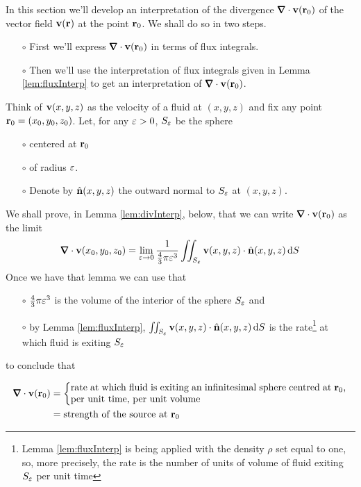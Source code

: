 In this section we'll develop an interpretation of the divergence
$\vnabla\cdot\vv(\vr_0)$ of the vector field $\mathbf{v}(\mathbf{r})$ at the point 
$\mathbf{r}_0$. We shall do so in two steps. 
\begin{itemize}\itemsep1pt \parskip0pt  %
\item[$\circ$]
First we'll express $\vnabla\cdot\vv(\vr_0)$ in terms of flux integrals.
\item[$\circ$] 
Then we'll use the interpretation of flux integrals given in 
Lemma \ref{lem:fluxInterp} to get an interpretation of 
$\vnabla\cdot\vv(\vr_0)$.

\end{itemize}
Think of $\mathbf{v}(x,y,z)$ as the velocity of a fluid at $(x,y,z)$ 
and fix any point $\mathbf{r}_0=(x_0,y_0,z_0)$. Let, for any $\varepsilon>0$,
$S_\varepsilon$ be the sphere
\begin{itemize}\itemsep1pt \parskip0pt  %
\item[$\circ$] centered at $\mathbf{r}_0$
\item[$\circ$] of radius $\varepsilon$.
\item[$\circ$] Denote by $\hat{\mathbf{n}}(x,y,z)$ the outward normal to $S_\varepsilon$
 at $(x,y,z)$.
\end{itemize}
We shall prove, in Lemma \ref{lem:divInterp}, below, that we can write
$\vnabla\cdot\vv(\vr_0)$ as the limit
\begin{align*}
\vnabla\cdot\vv(x_0,y_0,z_0)
=\lim_{\veps\rightarrow 0}
     \frac{1}{\frac{4}{3}\pi\veps^3}
           \dblInt_{S_\veps}\vv(x,y,z)\cdot\hn(x,y,z)\,\dee{S}
\end{align*}
Once we have that lemma we can use that
\begin{itemize}\itemsep1pt \parskip0pt  %
\item[$\circ$]
$\frac{4}{3}\pi\varepsilon^3$ is the volume of the interior of the sphere
$S_\varepsilon$ and 
\item[$\circ$] by Lemma \ref{lem:fluxInterp}, 
$\iint_{S_\varepsilon}\mathbf{v}(x,y,z)\cdot\hat{\mathbf{n}}(x,y,z)\,\mathrm{d}S$ is the 
rate\footnote{Lemma \ref{lem:fluxInterp} is being applied with the 
density $\rho$ set equal to one, so, more precisely, the rate is 
the number of units of volume of fluid exiting $S_\varepsilon$ per unit time} 
at which fluid is exiting $S_\varepsilon$
\end{itemize}
to conclude that 
\begin{impeqn}\label{eq:divInterp}
\begin{align*}
\vnabla\cdot\vv(\vr_0)
&=\left\{\parbox[c]{10.0cm}{rate at which fluid is exiting
                        an infinitesimal sphere centred at $\vr_0$, 
                        per unit time, per unit volume}
\right. \\
&=\text{strength of the source at $\vr_0$}
\end{align*}
\end{impeqn}
